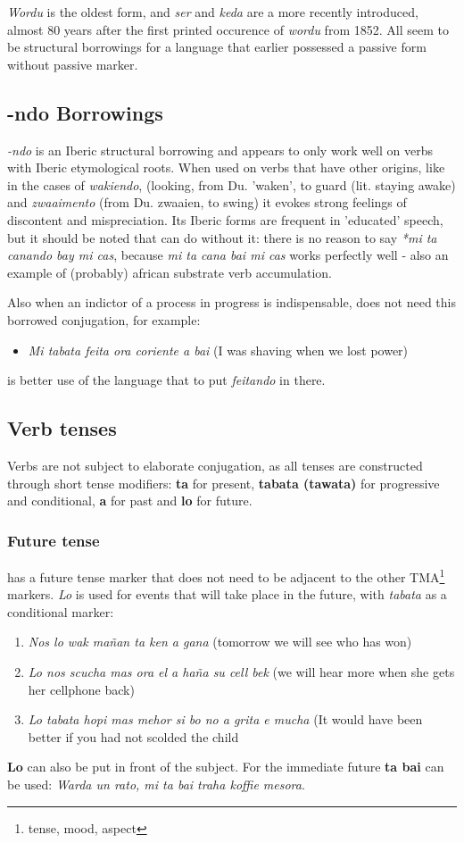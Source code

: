 \emph{Wordu} is the oldest form, and \emph{ser} and \emph{keda} are a more recently
introduced, almost 80 years after the first printed occurence of
\emph{wordu} from 1852. All seem to be structural borrowings for a language
that earlier \cite[199]{sanchez2005} possessed a passive form without passive
marker. 

\subsection{-ndo Borrowings}
\emph{-ndo} is an Iberic structural borrowing and appears to only work well on
verbs with Iberic etymological roots. When used on verbs that have
other origins, like in the cases of \emph{wakiendo}, (looking, from
Du. 'waken', to guard (lit. staying awake) and \emph{zwaaimento} (from
Du. zwaaien, to swing) it evokes
strong feelings of discontent and mispreciation. Its Iberic forms are frequent in
'educated' speech, but it should be noted that \pap{} can do without it: there is no reason to say \emph{*mi ta canando bay mi
  cas}, because \emph{mi ta cana bai mi cas} works perfectly well \cite[]{thijsentrimon2013} - also
an example of (probably) african substrate verb accumulation.

Also when an indictor of a process in progress is indispensable, \pap{} does not need
this borrowed conjugation, for example:
\begin{itemize}
\item \emph{Mi tabata feita ora coriente a bai} (I was shaving when we
  lost power)
\end{itemize}
is better use of the language that to put \emph{feitando} in there.


\subsection{Verb tenses}
Verbs are not subject to elaborate conjugation, as all tenses are
constructed through short tense modifiers: \textbf{ta} for present, \textbf{tabata (tawata)}
for progressive and conditional, \textbf{a} for past and \textbf{lo} for future.

\subsubsection{Future tense}
\pap{} has a future tense marker that does not need to be adjacent to the other
TMA\footnote{tense, mood, aspect} markers. \emph{Lo} is used for
events that will take place in the future, with \emph{tabata} as a
conditional marker:
\begin{enumerate}
\item \emph{Nos lo wak mañan ta ken a gana} (tomorrow we will see 
  who has won)
\item \emph{Lo nos scucha mas ora el a haña su cell bek} (we will hear
  more when she gets her cellphone back)
\item \emph{Lo tabata hopi mas mehor si bo no a grita e mucha} (It would have been
  better if you had not scolded the child
\end{enumerate}
\textbf{Lo} can also be put in front of the subject.
For the immediate future \textbf{ta bai} can be used: \emph{Warda un
  rato, mi ta bai traha koffie mesora}.

